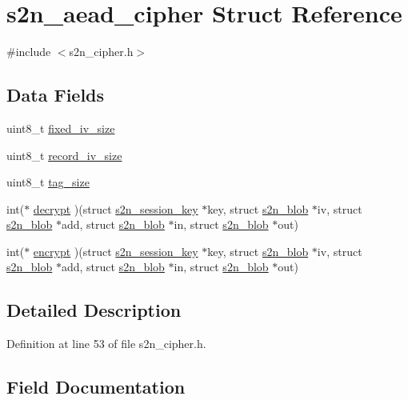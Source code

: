 \hypertarget{structs2n__aead__cipher}{}\section{s2n\+\_\+aead\+\_\+cipher Struct Reference}
\label{structs2n__aead__cipher}


{\ttfamily \#include $<$s2n\+\_\+cipher.\+h$>$}

\subsection*{Data Fields}
\begin{DoxyCompactItemize}
\item 
uint8\+\_\+t \hyperlink{structs2n__aead__cipher_af2f96dd7607527cb38344275a4282922}{fixed\+\_\+iv\+\_\+size}
\item 
uint8\+\_\+t \hyperlink{structs2n__aead__cipher_af6c57bc6bf62e1b811c6771a76e38448}{record\+\_\+iv\+\_\+size}
\item 
uint8\+\_\+t \hyperlink{structs2n__aead__cipher_a0bcbed39d70cb77892a96690e07f5389}{tag\+\_\+size}
\item 
int($\ast$ \hyperlink{structs2n__aead__cipher_ab0de9f364ac505a11483b249e38b492c}{decrypt} )(struct \hyperlink{structs2n__session__key}{s2n\+\_\+session\+\_\+key} $\ast$key, struct \hyperlink{structs2n__blob}{s2n\+\_\+blob} $\ast$iv, struct \hyperlink{structs2n__blob}{s2n\+\_\+blob} $\ast$add, struct \hyperlink{structs2n__blob}{s2n\+\_\+blob} $\ast$in, struct \hyperlink{structs2n__blob}{s2n\+\_\+blob} $\ast$out)
\item 
int($\ast$ \hyperlink{structs2n__aead__cipher_abd43963674b10a6cb1ce9d83a2d4d2a6}{encrypt} )(struct \hyperlink{structs2n__session__key}{s2n\+\_\+session\+\_\+key} $\ast$key, struct \hyperlink{structs2n__blob}{s2n\+\_\+blob} $\ast$iv, struct \hyperlink{structs2n__blob}{s2n\+\_\+blob} $\ast$add, struct \hyperlink{structs2n__blob}{s2n\+\_\+blob} $\ast$in, struct \hyperlink{structs2n__blob}{s2n\+\_\+blob} $\ast$out)
\end{DoxyCompactItemize}


\subsection{Detailed Description}


Definition at line 53 of file s2n\+\_\+cipher.\+h.



\subsection{Field Documentation}
